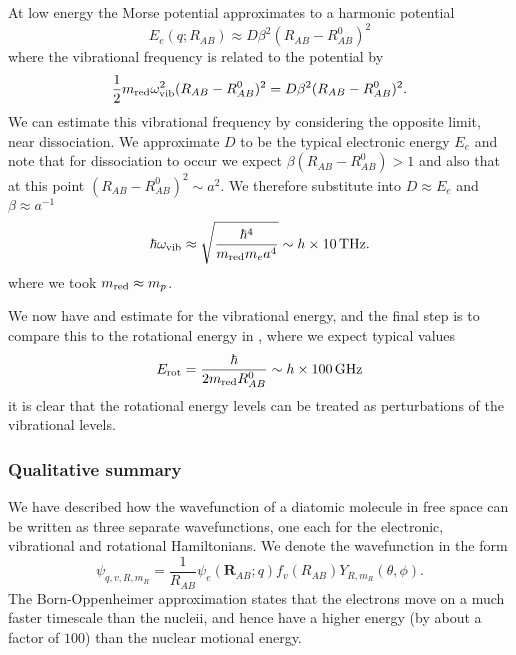 At low energy the Morse potential approximates
to a harmonic potential
%
\begin{equation}
  E_e(q; R_{AB}) \approx D\beta^2(R_{AB} - R_{AB}^0)^2
\end{equation}
%
where the vibrational frequency is related to the potential by
%
\begin{equation}
  \frac{1}{2}m_\text{red}{}\omega_\text{vib}^2(R_{AB}-R_{AB}^0)^2 = D\beta^2(R_{AB}-R_{AB}^0)^2.
  \label{theory:eqn:vibfreqrel}
\end{equation}  
%
We can estimate this vibrational frequency by considering the opposite limit,
near dissociation. We approximate $D$ to be the typical electronic energy $E_e$
and note that for dissociation to occur we expect $\beta(R_{AB} - R_{AB}^0) >
1$ and also that at this point $(R_{AB} - R_{AB}^0)^2\sim a^2$. We therefore
substitute into  $D\approx E_e$ and
$\beta\approx a^{-1}$
%
\begin{equation}
  \hbar\omega_\text{vib} \approx \sqrt{\frac{\hbar^4}{\mred{} m_e a^4}} \sim
    h\times\SI{10}{\tera\hertz}.
\end{equation}
%
where we took $m_\text{red}{}\approx m_p$.

We now have and estimate for the vibrational energy, and the final step is to
compare this to the rotational energy in , where
we expect typical values
%
\begin{equation}
  E_\text{rot} = \frac{\hbar}{2 m_\text{red}{} R^0_{AB}} \sim h\times\SI{100}{\giga\hertz}
\end{equation}
%
it is clear that the rotational energy levels can be treated as perturbations
of the vibrational levels.

\subsubsection{Qualitative summary}

We have described how the wavefunction of a diatomic molecule in free space can
be written as three separate wavefunctions, one each for the electronic,
vibrational and rotational Hamiltonians. We denote the wavefunction in the form
%
\begin{equation}
  \psi_{q, v, R, m_R} = \frac{1}{R_{AB}}\psi_e(\mathbf{R}_{AB};q)
  f_v(R_{AB})Y_{R, m_R}(\theta, \phi).
\end{equation}
%
The Born-Oppenheimer approximation states that the electrons move on a much
faster timescale than the nucleii, and hence have a higher energy (by about a
factor of $100$) than the nuclear motional energy.


